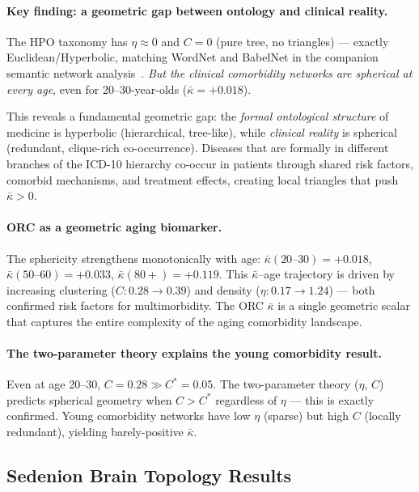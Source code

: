 \documentclass[11pt,a4paper]{article}
\newcommand{\kbar}{\bar{\kappa}}
\begin{document}
\paragraph{Key finding: a geometric gap between ontology and clinical reality.}
The HPO taxonomy has $\eta \approx 0$ and $C=0$ (pure tree, no triangles) --- exactly Euclidean/Hyperbolic, matching WordNet and BabelNet in the companion semantic network analysis~\cite{agourakis2026semantic}. \emph{But the clinical comorbidity networks are spherical at every age}, even for 20--30-year-olds ($\kbar=+0.018$).

This reveals a fundamental geometric gap: the \emph{formal ontological structure} of medicine is hyperbolic (hierarchical, tree-like), while \emph{clinical reality} is spherical (redundant, clique-rich co-occurrence). Diseases that are formally in different branches of the ICD-10 hierarchy co-occur in patients through shared risk factors, comorbid mechanisms, and treatment effects, creating local triangles that push $\kbar > 0$.

\paragraph{ORC as a geometric aging biomarker.}
The sphericity strengthens monotonically with age:
$\kbar(20\text{--}30) = +0.018$,
$\kbar(50\text{--}60) = +0.033$,
$\kbar(80+) = +0.119$.
This $\kbar$--age trajectory is driven by increasing clustering ($C: 0.28 \to 0.39$) and density ($\eta: 0.17 \to 1.24$) --- both confirmed risk factors for multimorbidity. The ORC $\kbar$ is a single geometric scalar that captures the entire complexity of the aging comorbidity landscape.

\paragraph{The two-parameter theory explains the young comorbidity result.}
Even at age 20--30, $C=0.28 \gg C^*=0.05$. The two-parameter theory ($\eta$, $C$) predicts spherical geometry when $C > C^*$ regardless of $\eta$ --- this is exactly confirmed. Young comorbidity networks have low $\eta$ (sparse) but high $C$ (locally redundant), yielding barely-positive $\kbar$.

\subsection{Sedenion Brain Topology Results}
\label{sec:sedenion_results}
\end{document}
